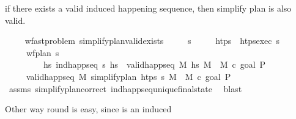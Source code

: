 \begin{isabellebody}
\begin{isamarkuptext}
  if there exists a valid induced happening sequence, then simplify plan is also valid.%
\end{isamarkuptext}\isamarkuptrue%
\ \ \isamarkupfalse%
\ {\isacharparenleft}{\kern0pt}\ wf{\isacharunderscore}{\kern0pt}ast{\isacharunderscore}{\kern0pt}problem{\isacharparenright}{\kern0pt}\ simplify{\isacharunderscore}{\kern0pt}plan{\isacharunderscore}{\kern0pt}valid{\isacharunderscore}{\kern0pt}exists{}{\isacharcolon}{\kern0pt}\isanewline
\ \ \ \ \ {\isasympi}s\isanewline
\ \ \ \ \ {\isachardoublequoteopen}htps\ {\isasymequiv}\ htps{\isacharunderscore}{\kern0pt}exec\ {\isasympi}s{\isachardoublequoteclose}\isanewline
\ \ \ \ \ {\isachardoublequoteopen}wf{\isacharunderscore}{\kern0pt}plan\ {\isasympi}s{\isachardoublequoteclose}\isanewline
\ \ \ \ \ \ \ \ \ {\isachardoublequoteopen}{\isasymexists}hs{\isachardot}{\kern0pt}\ ind{\isacharunderscore}{\kern0pt}happ{\isacharunderscore}{\kern0pt}seq\ {\isasympi}s\ hs\ {\isasymand}\ valid{\isacharunderscore}{\kern0pt}happ{\isacharunderscore}{\kern0pt}seq\ M\ hs\ M{\isacharprime}{\kern0pt}\ {\isasymand}\ M{\isacharprime}{\kern0pt}\ \isactrlsup c{\isasymTTurnstile}\isactrlsub {\isacharequal}{\kern0pt}\ {\isacharparenleft}{\kern0pt}goal\ P{\isacharparenright}{\kern0pt}{\isachardoublequoteclose}\isanewline
\ \ \ \ \ {\isachardoublequoteopen}valid{\isacharunderscore}{\kern0pt}happ{\isacharunderscore}{\kern0pt}seq\ M\ {\isacharparenleft}{\kern0pt}simplify{\isacharunderscore}{\kern0pt}plan\ htps\ {\isasympi}s{\isacharparenright}{\kern0pt}\ M{\isacharprime}{\kern0pt}\ {\isasymand}\ M{\isacharprime}{\kern0pt}\ \isactrlsup c{\isasymTTurnstile}\isactrlsub {\isacharequal}{\kern0pt}\ {\isacharparenleft}{\kern0pt}goal\ P{\isacharparenright}{\kern0pt}{\isachardoublequoteclose}\isanewline
%
\isadelimproof
\ \ \ \ %
\endisadelimproof
%
\isatagproof
{}\isamarkupfalse%
\ assms\ simplify{\isacharunderscore}{\kern0pt}plan{\isacharunderscore}{\kern0pt}correct\ ind{\isacharunderscore}{\kern0pt}happ{\isacharunderscore}{\kern0pt}seq{\isacharunderscore}{\kern0pt}unique{\isacharunderscore}{\kern0pt}final{\isacharunderscore}{\kern0pt}state{\isacharprime}{\kern0pt}\ \isamarkupfalse%
\ blast%
\endisatagproof
{\isafoldproof}%
%
\isadelimproof
%
\endisadelimproof
%
\begin{isamarkuptext}%
Other way round is easy, since  is an induced 

\end{isamarkuptext}
\end{isabellebody}
